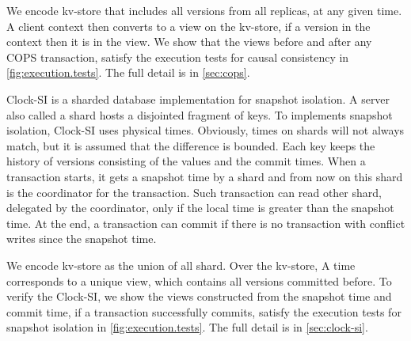 We encode kv-store that includes all versions from all replicas, at any given time.
A client context then converts to a view on the kv-store, 
\ie if a version in the context then it is in the view.
We show that the views before and after any COPS transaction,
satisfy the execution tests for causal consistency in \cref{fig:execution.tests}.
The full detail is in \cref{sec:cops}.

Clock-SI is a sharded database implementation for snapshot isolation.
A server also called a shard hosts a disjointed fragment of keys.
To implements snapshot isolation, Clock-SI uses physical times.
Obviously, times on shards will not always match, but it is assumed that the difference is bounded.
Each key keeps the history of versions consisting of the values and the commit times.
When a transaction starts, it gets a snapshot time by a shard 
and from now on this shard is the coordinator for the transaction.
Such transaction can read other shard, delegated by the coordinator, only if the local time is greater than the snapshot time.
At the end, a transaction can commit if there is no transaction with conflict writes since the snapshot time.

We encode kv-store as the union of all shard.
Over the kv-store, 
A time corresponds to a unique view,
which contains all versions committed before.
To verify the Clock-SI, 
we show the views constructed from the snapshot time and commit time,
if a transaction successfully commits, 
satisfy the execution tests for snapshot isolation in \cref{fig:execution.tests}.
The full detail is in \cref{sec:clock-si}.
